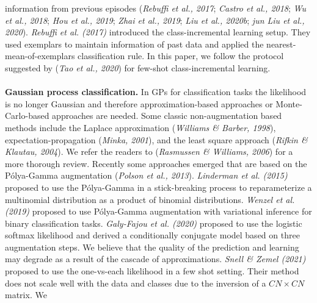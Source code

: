 \documentclass[preprint,11pt]{elsarticle}
\begin{document}
    information from previous episodes (\textit{Rebuffi et al., 2017}\cite{rebuffi2017icarl};
    \textit{Castro et al., 2018}\cite{castro2018end}; \textit{Wu et al., 2018}\cite{wu2018memory}; \textit{Hou et al., 2019}\cite{hou2019learning}; \textit{Zhai
    et al., 2019}\cite{zhai2019lifelong}; \textit{Liu et al., 2020b}\cite{liu2020when}; \textit{jun Liu et al., 2020}\cite{liu2020more}). \textit{Rebuffi
    et al. (2017)}\cite{rebuffi2017icarl} introduced the class-incremental learning setup.
    They used exemplars to maintain information of past data
    and applied the nearest-mean-of-exemplars classification
    rule. In this paper, we follow the protocol suggested by (\textit{Tao
    et al., 2020}\cite{tao2020few}) for few-shot class-incremental learning.
    \\
    \\
    \textbf{Gaussian process classification.} In GPs for classification
    tasks the likelihood is no longer Gaussian and therefore
    approximation-based approaches or Monte-Carlo-based approaches
    are needed. Some classic non-augmentation based
    methods include the Laplace approximation (\textit{Williams \&
    Barber, 1998}\cite{williams1998bayesian}), expectation-propagation (\textit{Minka, 2001}\cite{minka2001family}), and
    the least square approach (\textit{Rifkin \& Klautau, 2004}\cite{rifkin2004defense}). We
    refer the readers to (\textit{Rasmussen \& Williams, 2006}\cite{rasmussen2006gaussian}) for a
    more thorough review. Recently some approaches emerged
    that are based on the Pólya-Gamma augmentation (\textit{Polson
    et al., 2013}\cite{polson2013bayesian}). \textit{Linderman et al. (2015)}\cite{linderman2015dependent} proposed to use the
    Pólya-Gamma in a stick-breaking process to reparameterize
    a multinomial distribution as a product of binomial distributions.
    \textit{Wenzel et al. (2019)}\cite{wenzel2019efficient} proposed to use Pólya-Gamma
    augmentation with variational inference for binary classification
    tasks. \textit{Galy-Fajou et al. (2020)}\cite{galy2020multiclass} proposed to use the
    logistic softmax likelihood and derived a conditionally conjugate
    model based on three augmentation steps. We believe
    that the quality of the prediction and learning may degrade as a result of the cascade of approximations. \textit{Snell \& Zemel
    (2021)}\cite{snell2021bayesian} proposed to use the one-vs-each likelihood in a few
    shot setting. Their method does not scale well with the data
    and classes due to the inversion of a $CN \times CN$ matrix. We
\end{document}
